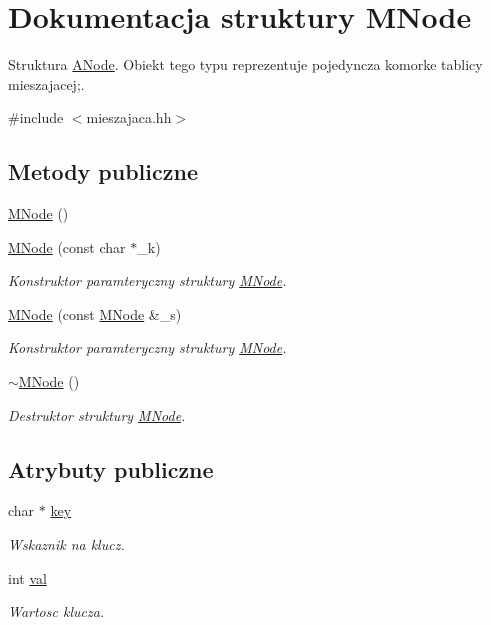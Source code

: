 \hypertarget{struct_m_node}{\section{Dokumentacja struktury M\-Node}
\label{struct_m_node}
}


Struktura \hyperlink{struct_a_node}{A\-Node}. Obiekt tego typu reprezentuje pojedyncza komorke tablicy mieszajacej;.  




{\ttfamily \#include $<$mieszajaca.\-hh$>$}

\subsection*{Metody publiczne}
\begin{DoxyCompactItemize}
\item 
\hyperlink{struct_m_node_a4f5e9c524bf97b5694d8f008e9436996}{M\-Node} ()
\item 
\hyperlink{struct_m_node_a7996f4c14c867e740670e4571e8d5189}{M\-Node} (const char $\ast$\-\_\-k)
\begin{DoxyCompactList}\small\item\em Konstruktor paramteryczny struktury \hyperlink{struct_m_node}{M\-Node}. \end{DoxyCompactList}\item 
\hyperlink{struct_m_node_a5f21b0e7ec69965c0105920e06241a47}{M\-Node} (const \hyperlink{struct_m_node}{M\-Node} \&\-\_\-s)
\begin{DoxyCompactList}\small\item\em Konstruktor paramteryczny struktury \hyperlink{struct_m_node}{M\-Node}. \end{DoxyCompactList}\item 
\hyperlink{struct_m_node_aa96f44f28eee1e25a9a267baaa61813d}{$\sim$\-M\-Node} ()
\begin{DoxyCompactList}\small\item\em Destruktor struktury \hyperlink{struct_m_node}{M\-Node}. \end{DoxyCompactList}\end{DoxyCompactItemize}
\subsection*{Atrybuty publiczne}
\begin{DoxyCompactItemize}
\item 
char $\ast$ \hyperlink{struct_m_node_a34eaceeae213bc93c9f18b752801a1f0}{key}
\begin{DoxyCompactList}\small\item\em Wskaznik na klucz. \end{DoxyCompactList}\item 
int \hyperlink{struct_m_node_a9ba04f597c758c10b9f2309322fe4c8d}{val}
\begin{DoxyCompactList}\small\item\em Wartosc klucza. \end{DoxyCompactList}\end{DoxyCompactItemize}
